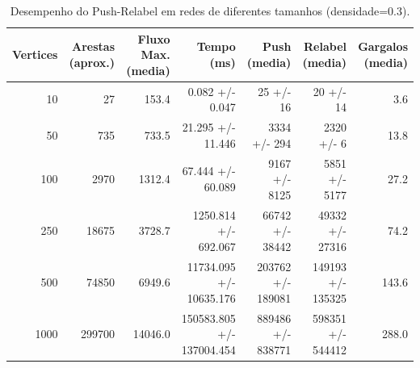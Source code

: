 \begin{table}
\caption{Desempenho do Push-Relabel em redes de diferentes tamanhos (densidade=0.3).}
\label{tab:escalabilidade}
\begin{tabular}{r r r r r r r}
\toprule
Vertices & Arestas (aprox.) & Fluxo Max. (media) & Tempo (ms) & Push (media) & Relabel (media) & Gargalos (media) \\
\midrule
10 & 27 & 153.4 & 0.082 +/- 0.047 & 25 +/- 16 & 20 +/- 14 & 3.6 \\
50 & 735 & 733.5 & 21.295 +/- 11.446 & 3334 +/- 294 & 2320 +/- 6 & 13.8 \\
100 & 2970 & 1312.4 & 67.444 +/- 60.089 & 9167 +/- 8125 & 5851 +/- 5177 & 27.2 \\
250 & 18675 & 3728.7 & 1250.814 +/- 692.067 & 66742 +/- 38442 & 49332 +/- 27316 & 74.2 \\
500 & 74850 & 6949.6 & 11734.095 +/- 10635.176 & 203762 +/- 189081 & 149193 +/- 135325 & 143.6 \\
1000 & 299700 & 14046.0 & 150583.805 +/- 137004.454 & 889486 +/- 838771 & 598351 +/- 544412 & 288.0 \\
\bottomrule
\end{tabular}
\end{table}

